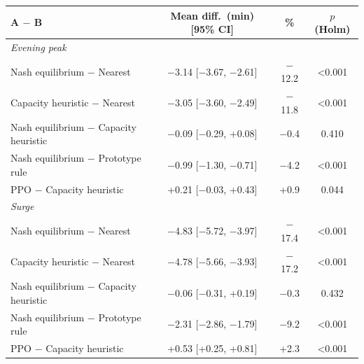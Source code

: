 \begin{tabular}{lccc}
\toprule
A $-$ B & Mean diff.\ (min) [95\% CI] & \% & $p$ (Holm) \\
\midrule
\multicolumn{4}{l}{\textit{Evening peak}} \\
Nash equilibrium $-$ Nearest & $-$3.14 [$-$3.67, $-$2.61] & $-$12.2 & <0.001 \\
Capacity heuristic $-$ Nearest & $-$3.05 [$-$3.60, $-$2.49] & $-$11.8 & <0.001 \\
Nash equilibrium $-$ Capacity heuristic & $-$0.09 [$-$0.29, +0.08] & $-$0.4 & 0.410 \\
Nash equilibrium $-$ Prototype rule & $-$0.99 [$-$1.30, $-$0.71] & $-$4.2 & <0.001 \\
PPO $-$ Capacity heuristic & +0.21 [$-$0.03, +0.43] & +0.9 & 0.044 \\
\multicolumn{4}{l}{\textit{Surge}} \\
Nash equilibrium $-$ Nearest & $-$4.83 [$-$5.72, $-$3.97] & $-$17.4 & <0.001 \\
Capacity heuristic $-$ Nearest & $-$4.78 [$-$5.66, $-$3.93] & $-$17.2 & <0.001 \\
Nash equilibrium $-$ Capacity heuristic & $-$0.06 [$-$0.31, +0.19] & $-$0.3 & 0.432 \\
Nash equilibrium $-$ Prototype rule & $-$2.31 [$-$2.86, $-$1.79] & $-$9.2 & <0.001 \\
PPO $-$ Capacity heuristic & +0.53 [+0.25, +0.81] & +2.3 & <0.001 \\
\bottomrule
\end{tabular}
